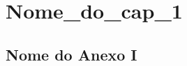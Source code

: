 \documentclass[
	oldfontcommands,
	sumario=tradicional,
	12pt,      %
	openright, %
	oneside,   %
	a4paper,   %
	english, %
	brazil   %
	]{imecc-unicamp}
\begin{document}
		\chapter{Nome_do_cap_1} \label{cap_ideia_do_nome}
		
		
		

		\postextual


	
	\begin{anexosenv} %
		\partanexos
		
		\chapter{Nome do Anexo I} \label{A_ideia_do_nome_do_anexoI}
		
		
			
	\end{anexosenv}
\end{document}
